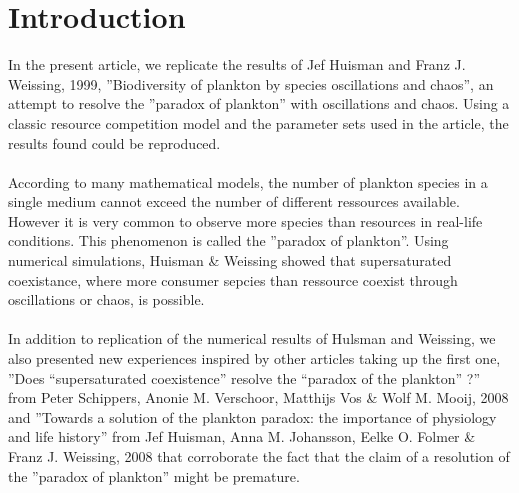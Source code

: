 \section{Introduction}
In the present article, we replicate the results of Jef Huisman and Franz J. Weissing, 1999, ”Biodiversity of plankton by species oscillations and chaos”\supercite{1999:Huisman}, an attempt to resolve the ”paradox of plankton”\supercite{1961:Hutchinson} with oscillations and chaos. Using a classic resource competition model and the parameter sets used in the article, the results found could be reproduced.\\
\\
According to many mathematical models, the number of plankton species in a single medium cannot exceed the number of different ressources available\supercite{1960:Hardin,1973:Phillips,1980:Armstrong}. However it is very common to observe more species than resources in real-life conditions. This phenomenon is called the ”paradox of plankton”\supercite{1961:Hutchinson}. Using numerical simulations, Huisman \& Weissing\supercite{1999:Huisman} showed that supersaturated coexistance, where more consumer sepcies than ressource coexist through oscillations or chaos, is possible.\\
\\
In addition to replication of the numerical results of Hulsman and Weissing, we also presented new experiences inspired by other articles taking up the first one, ”Does “supersaturated coexistence” resolve the “paradox of the plankton” ?”\supercite{2008:Schippers} from Peter Schippers, Anonie M. Verschoor, Matthijs Vos \& Wolf M. Mooij, 2008 and ”Towards a solution of the plankton paradox: the importance of physiology and life history”\supercite{2008:Huisman} from Jef Huisman, Anna M. Johansson, Eelke O. Folmer \& Franz J. Weissing, 2008 that corroborate the fact that the claim of a resolution of the ”paradox of plankton” might be premature.
